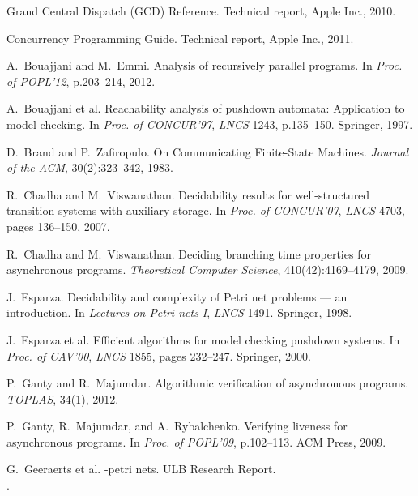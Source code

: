 \documentclass[runningheads,oribibl,]{article}
\begin{document}
\newcommand{\nb}{}
\begin{thebibliography}{10}

{G}rand {C}entral {D}ispatch ({GCD}) {R}eference.
\nb Technical report, Apple Inc., 2010.

{C}oncurrency {P}rogramming {G}uide.
\nb Technical report, Apple Inc., 2011.

A.~Bouajjani and M.~Emmi.
\nb Analysis of recursively parallel programs.
\nb In {\em Proc. of POPL'12}, p.203--214, 2012.

A.~Bouajjani et al.
\nb Reachability analysis of pushdown automata: Application to
  model-checking.
\nb In {\em Proc. of CONCUR'97}, {\em {LNCS}} 1243, p.135--150. Springer,
  1997.

D.~Brand and P.~Zafiropulo.
\nb {O}n {C}ommunicating {F}inite-{S}tate {M}achines.
\nb {\em Journal of the ACM}, 30(2):323--342, 1983.

R.~Chadha and M.~Viswanathan.
\nb Decidability results for well-structured transition systems with
  auxiliary storage.
\nb In {\em Proc. of CONCUR'07}, {\em {LNCS}} 4703, pages
  136--150, 2007.

R.~Chadha and M.~Viswanathan.
\nb Deciding branching time properties for asynchronous programs.
\nb {\em Theoretical Computer Science}, 410(42):4169--4179, 2009.

J.~Esparza.
\nb Decidability and complexity of {P}etri net problems {---} an
  introduction.
\nb In {\em Lectures on Petri nets I}, {\em {LNCS}} 1491.
  Springer, 1998.

J.~Esparza et al.
\nb Efficient algorithms for model checking pushdown systems.
\nb In {\em Proc. of CAV'00}, {\em {LNCS}} 1855, pages
  232--247. Springer, 2000.

P.~Ganty and R.~Majumdar.
\nb Algorithmic verification of asynchronous programs.
\nb {\em TOPLAS}, 34(1), 2012.

P.~Ganty, R.~Majumdar, and A.~Rybalchenko.
\nb Verifying liveness for asynchronous programs.
\nb In {\em Proc. of POPL'09}, p.102--113. ACM Press, 2009.

G.~Geeraerts et al.
\nb {}-petri nets.
\nb ULB Research Report.\\
\nb
{}.


\end{thebibliography}
\end{document}
